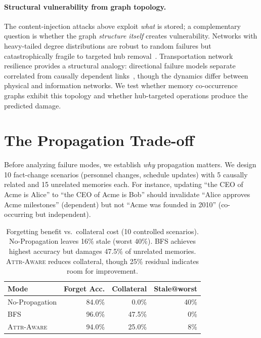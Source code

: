 \documentclass{article}
\newcommand{\attraware}{\textsc{Attr-Aware}}
\newcommand{\bfsprop}{\textsc{BFS}}
\begin{document}
\paragraph{Structural vulnerability from graph topology.}
The content-injection attacks above exploit \textit{what} is stored; a complementary question is whether the graph \textit{structure itself} creates vulnerability.
Networks with heavy-tailed degree distributions are robust to random failures but catastrophically fragile to targeted hub removal~\citep{albert_attack_2000, cohen_percolation_2000}.
Transportation network resilience provides a structural analogy: directional failure models separate correlated from causally dependent links~\citep{chen_network_2007}, though the dynamics differ between physical and information networks.
We test whether memory co-occurrence graphs exhibit this topology and whether hub-targeted operations produce the predicted damage.


\section{The Propagation Trade-off}
\label{sec:tradeoff}

Before analyzing failure modes, we establish \textit{why} propagation matters.
We design 10 fact-change scenarios (personnel changes, schedule updates) with 5 causally related and 15 unrelated memories each.
For instance, updating ``the CEO of Acme is Alice'' to ``the CEO of Acme is Bob'' should invalidate ``Alice approves Acme milestones'' (dependent) but not ``Acme was founded in 2010'' (co-occurring but independent).

\begin{table}[htbp]
\centering
\footnotesize
\begin{tabular}{lrrr}
\toprule
\textbf{Mode} & \textbf{Forget Acc.} & \textbf{Collateral} & \textbf{Stale@worst} \\
\midrule
No-Propagation & 84.0\% & 0.0\% & 40\% \\
\bfsprop{} & 96.0\% & 47.5\% & 0\% \\
\attraware{} & 94.0\% & 25.0\% & 8\% \\
\bottomrule
\end{tabular}
\caption{Forgetting benefit vs.\ collateral cost (10 controlled scenarios).
No-Propagation leaves 16\% stale (worst 40\%).
BFS achieves highest accuracy but damages 47.5\% of unrelated memories.
\attraware{} reduces collateral, though 25\% residual indicates room for improvement.}
\label{tab:forgetting}
\end{table}
\end{document}
